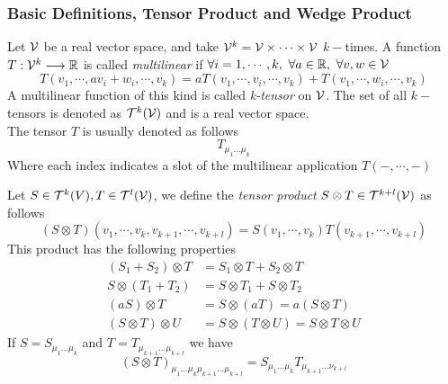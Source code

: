 \documentclass[../complete.tex]{subfiles}
\begin{document}
\subsubsection{Basic Definitions, Tensor Product and Wedge Product}
\begin{dfn}
	Let $\mathcal{V}$ be a real vector space, and take $\mathcal{V}^k=\mathcal{V}\times\cdots\times\mathcal{V}$ $k-$times. A function $T:\mathcal{V}^k\overset{}{\longrightarrow}\mathbb{R}$ is called \textit{multilinear} if $\forall i=1,\cdots,k,\ \forall a\in\mathbb{R},\ \forall v,w\in\mathcal{V}$
	\begin{equation}
		T(v_1,\cdots,av_i+w_i,\cdots,v_k)=aT(v_1,\cdots,v_i,\cdots,v_k)+T(v_1,\cdots,w_i,\cdots,v_k)
		\label{eq:multilinearapp}
	\end{equation}
	A multilinear function of this kind is called \textit{k-tensor} on $\mathcal{V}$. The set of all $k-$tensors is denoted as $\mathcal{T}^k(\mathcal{V})$ and is a real vector space.\\
	The tensor $T$ is usually denoted as follows
	\begin{equation}
		T_{\mu_1\ldots\mu_k}
		\label{eq:ktensordef}
	\end{equation}
	Where each index indicates a slot of the multilinear application $T(-,\cdots,-)$
\end{dfn}
\begin{dfn}
	Let $S\in\mathcal{T}^k(V),T\in\mathcal{T}^l(\mathcal{V})$, we define the \textit{tensor product} $S\otimes T\in\mathcal{T}^{k+l}(\mathcal{V})$ as follows
	\begin{equation}
		(S\otimes T)(v_1,\cdots,v_k,v_{k+1},\cdots,v_{k+l})=S(v_1,\cdots,v_k)T(v_{k+1},\cdots,v_{k+l})
		\label{eq:tensorprod}
	\end{equation}
	This product has the following properties
	\begin{equation}
		\begin{aligned}
			\left( S_1+S_2 \right)\otimes T&=S_1\otimes T+S_2\otimes T\\
			S\otimes(T_1+T_2)&=S\otimes T_1+S\otimes T_2\\
			(aS)\otimes T&=S\otimes(aT)=a(S\otimes T)\\
			(S\otimes T)\otimes U&= S\otimes(T\otimes U)=S\otimes T\otimes U
		\end{aligned}
		\label{eq:properties}
	\end{equation}
	If $S=S_{\mu_1\ldots\mu_k}$ and $T=T_{\mu_{k+1}\ldots\mu_{k+l}}$ we have
	\begin{equation}
		(S\otimes T)_{\mu_1\ldots\mu_k\mu_{k+1}\ldots\mu_{k+l}}=S_{\mu_1\ldots\mu_k}T_{\mu_{k+1}\ldots\nu_{k+l}}
		\label{eq:tensorprodein}
	\end{equation}
\end{dfn}
\end{document}
